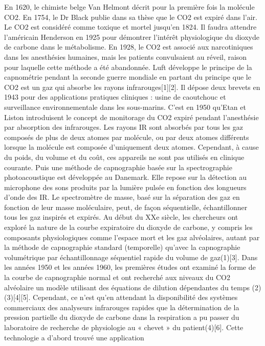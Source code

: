 \documentclass[12pt,]{article}
\begin{document}
En 1620, le chimiste belge Van Helmont décrit pour la première fois la
molécule CO2. En 1754, le Dr Black publie dans sa thèse que le CO2 est
expiré dans l'air. Le CO2 est considéré comme toxique et mortel jusqu'en
1824. Il faudra attendre l'américain Henderson en 1925 pour démontrer
l'intérêt physiologique du dioxyde de carbone dans le métabolisme. En
1928, le CO2 est associé aux narcotiniques dans les anesthésies
humaines, mais les patients convulsaient au réveil, raison pour laquelle
cette méthode a été abandonnée. Luft développe le principe de la
capnométrie pendant la seconde guerre mondiale en partant du principe
que le CO2 est un gaz qui absorbe les rayons infrarouges{[}1{]}{[}2{]}.
Il dépose deux brevets en 1943 pour des applications pratiques cliniques
: usine de caoutchouc et surveillance environnementale dans les
sous-marins. C'est en 1950 qu'Etan et Liston introduisent le concept de
monitorage du CO2 expiré pendant l'anesthésie par absorption des
infrarouges. Les rayons IR sont absorbés par tous les gaz composés de
plus de deux atomes par molécule, ou par deux atomes différents lorsque
la molécule est composée d'uniquement deux atomes. Cependant, à cause du
poids, du volume et du coût, ces appareils ne sont pas utilisés en
clinique courante. Puis une méthode de capnographie basée sur la
spectrographie photoacoustique est développée au Danemark. Elle repose
sur la détection au microphone des sons produits par la lumière pulsée
en fonction des longueurs d'onde des IR. Le spectromètre de masse, basé
sur la séparation des gaz en fonction de leur masse moléculaire, peut,
de façon séquentielle, échantillonner tous les gaz inspirés et expirés.
Au début du XXe siècle, les chercheurs ont exploré la nature de la
courbe expiratoire du dioxyde de carbone, y compris les composants
physiologiques comme l'espace mort et les gaz alvéolaires, autant par la
méthode de capnographie standard (temporelle) qu'avec la capnographie
volumétrique par échantillonnage séquentiel rapide du volume de
gaz(1){[}3{]}. Dans les années 1950 et les années 1960, les premières
études ont examiné la forme de la courbe de capnographie normal et ont
recherché aux niveaux du CO2 alvéolaire un modèle utilisant des
équations de dilution dépendantes du temps (2)(3){[}4{]}{[}5{]}.
Cependant, ce n'est qu'en attendant la disponibilité des systèmes
commerciaux des analyseurs infrarouges rapides que la détermination de
la pression partielle du dioxyde de carbone dans la respiration a pu
passer du laboratoire de recherche de physiologie au « chevet » du
patient(4){[}6{]}. Cette technologie a d'abord trouvé une application
\end{document}
